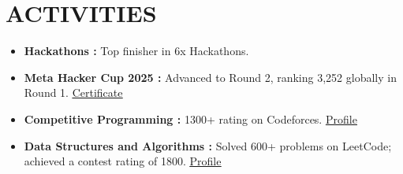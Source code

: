 \documentclass[letterpaper,11pt]{article}
\newcommand{\resumeItem}[1]{
  \item\small{
    {#1 \vspace{-1pt}}
  }
}
\newcommand{\resumeItemListStart}{\begin{itemize}[leftmargin=0.1in]}
\newcommand{\resumeItemListEnd}{\end{itemize}\vspace{-5pt}}
\begin{document}
\section{\color{airforceblue}ACTIVITIES}
    \vspace{2pt}
  \resumeItemListStart
    \resumeItem{\textbf{\normalsize{Hackathons :}}{\normalsize{ Top finisher in 6x Hackathons.}}}
    \vspace{-5pt}
    \resumeItem{\textbf{\normalsize{Meta Hacker Cup 2025 :}}{\normalsize{ Advanced to Round 2, ranking 3,252 globally in Round 1.
    \href{https://www.linkedin.com/posts/shuklaabhinav824_metahackercup-competitiveprogramming-softwareengineering-activity-7386800360671240192-Ns40}
    {\color{blue}\underline{Certificate}}
    }}}
    \vspace{-5pt}
    \resumeItem{\textbf{\normalsize{Competitive Programming :}}\normalsize{ 1300+ rating on Codeforces. \href{https://codeforces.com/profile/StarLord024}{\color{blue}\underline{Profile}}}}
    \vspace{-5pt}
    \resumeItem{\textbf{\normalsize{Data Structures and Algorithms :}}{\normalsize{ Solved 600+ problems on LeetCode; achieved a contest rating of 1800. \href{https://leetcode.com/u/shuklaabhinav824/}{\color{blue}\underline{Profile}} }}}
    \vspace{-5pt}
    
    
  \resumeItemListEnd 
      
\vspace{1pt}
\end{document}
